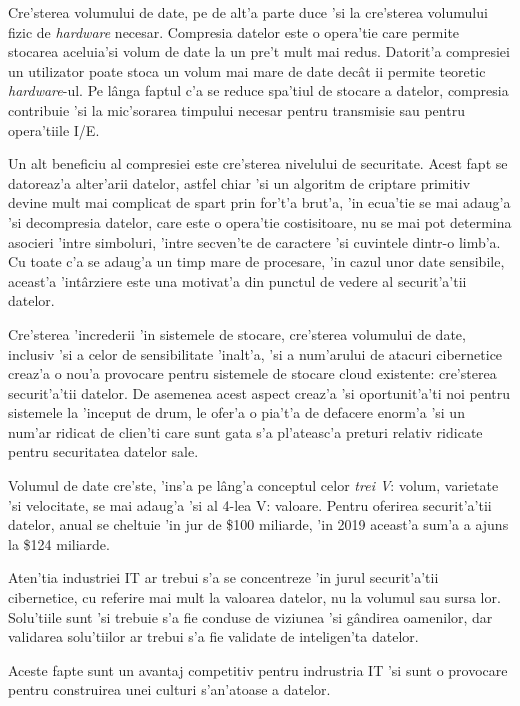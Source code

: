 \documentclass[12pt,a4paper,twoside]{report}
\begin{document}
Cre'sterea volumului de date, pe de alt'a parte duce 'si la cre'sterea volumului fizic de \textit{hardware} necesar. Compresia datelor este o opera'tie care permite stocarea aceluia'si volum de date la un pre't mult mai redus\cite{data_compression_ibm}. Datorit'a compresiei un utilizator poate stoca un volum mai mare de date decât ii permite teoretic \textit{hardware}-ul. Pe lânga faptul c'a se reduce spa'tiul de stocare a datelor, compresia contribuie 'si la mic'sorarea timpului necesar pentru transmisie sau pentru opera'tiile I/E\cite{compression_adv}. 

Un alt beneficiu al compresiei este cre'sterea nivelului de securitate. Acest fapt se datoreaz'a alter'arii datelor, astfel chiar 'si un algoritm de criptare primitiv devine mult mai complicat de spart prin for't'a brut'a, 'in ecua'tie se mai adaug'a 'si decompresia datelor, care este o opera'tie costisitoare, nu se mai pot determina asocieri 'intre simboluri, 'intre secven'te de caractere 'si cuvintele dintr-o limb'a. Cu toate c'a se adaug'a un timp mare de procesare, 'in cazul unor date sensibile, aceast'a 'intârziere este una motivat'a din punctul de vedere al securit'a'tii datelor.

Cre'sterea 'increderii 'in sistemele de stocare, cre'sterea volumului de date, inclusiv 'si a celor de sensibilitate 'inalt'a, 'si  a num'arului de atacuri cibernetice creaz'a o nou'a provocare pentru sistemele de stocare cloud existente: cre'sterea securit'a'tii datelor. De asemenea acest aspect creaz'a 'si oportunit'a'ti noi pentru sistemele la 'inceput de drum, le ofer'a o pia't'a de defacere enorm'a 'si un num'ar ridicat de clien'ti care sunt gata s'a pl'ateasc'a preturi relativ ridicate pentru securitatea datelor sale.

Volumul de date cre'ste, 'ins'a pe lâng'a conceptul celor \textit{trei V}: volum, varietate 'si velocitate, se mai adaug'a 'si al 4-lea V: valoare. Pentru oferirea securit'a'tii datelor, anual se cheltuie 'in jur de \$100 miliarde, 'in 2019 aceast'a sum'a a ajuns la \$124 miliarde.

Aten'tia industriei IT ar trebui s'a se concentreze 'in jurul securit'a'tii cibernetice, cu referire mai mult la valoarea datelor, nu la volumul sau sursa lor. Solu'tiile sunt 'si trebuie s'a fie conduse de viziunea 'si gândirea oamenilor, dar validarea solu'tiilor ar trebui s'a fie validate de inteligen'ta datelor. 
 
Aceste fapte sunt un avantaj competitiv pentru indrustria IT 'si sunt o provocare pentru construirea unei culturi s'an'atoase a datelor.
\end{document}
